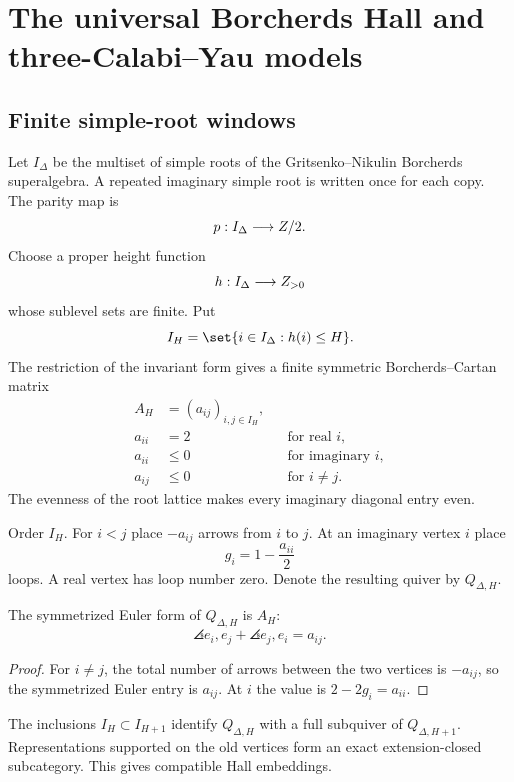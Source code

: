 \part{The universal Borcherds Hall and three-Calabi--Yau models}

\chapter{Finite simple-root windows}
Let $I_\Delta$ be the multiset of simple roots of the Gritsenko--Nikulin Borcherds superalgebra.  A repeated imaginary simple root is written once for each copy.  The parity map is
\[
 p:I_\Delta\longrightarrow Z/2.
\]
Choose a proper height function
\[
 h:I_\Delta\longrightarrow Z_{>0}
\]
whose sublevel sets are finite.  Put
\[
 I_H=\set{i\in I_\Delta:h(i)\le H}.
\]
The restriction of the invariant form gives a finite symmetric Borcherds--Cartan matrix
\[
\begin{aligned}
 A_H&=(a_{ij})_{i,j\in I_H},\\
 a_{ii}&=2 &&\text{for real }i,\\
 a_{ii}&\leq0 &&\text{for imaginary }i,\\
 a_{ij}&\leq0 &&\text{for }i\neq j.
\end{aligned}
\]
The evenness of the root lattice makes every imaginary diagonal entry even.

\begin{construction}
Order $I_H$.  For $i<j$ place $-a_{ij}$ arrows from $i$ to $j$.  At an imaginary vertex $i$ place
\[
 g_i=1-\frac{a_{ii}}2
\]
loops.  A real vertex has loop number zero.  Denote the resulting quiver by $Q_{\Delta,H}$.
\end{construction}

\begin{proposition}
The symmetrized Euler form of $Q_{\Delta,H}$ is $A_H$:
\[
 \angles{e_i,e_j}+\angles{e_j,e_i}=a_{ij}.
\]
\end{proposition}
\begin{proof}
For $i\ne j$, the total number of arrows between the two vertices is $-a_{ij}$, so the symmetrized Euler entry is $a_{ij}$.  At $i$ the value is $2-2g_i=a_{ii}$.
\end{proof}

The inclusions $I_H\subset I_{H+1}$ identify $Q_{\Delta,H}$ with a full subquiver of $Q_{\Delta,H+1}$.  Representations supported on the old vertices form an exact extension-closed subcategory.  This gives compatible Hall embeddings.


